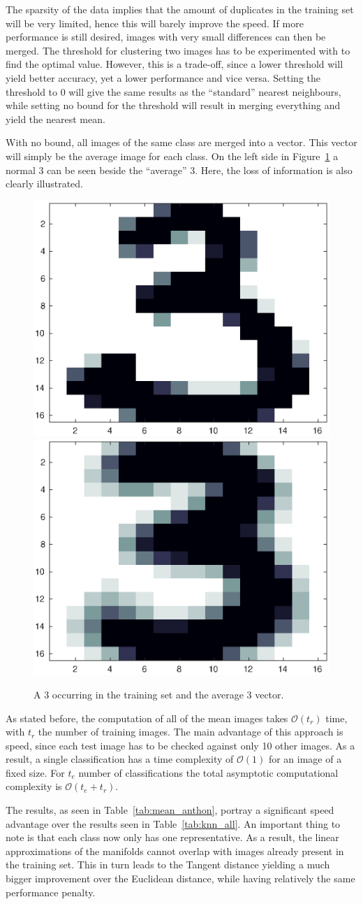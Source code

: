 The sparsity of the data implies that the amount of duplicates in the training set will be very limited, hence this will barely improve the speed.
If more performance is still desired, images with very small differences can then be merged.
The threshold for clustering two images has to be experimented with to find the optimal value.
However, this is a trade-off, since a lower threshold will yield better accuracy, yet a lower performance and vice versa.
Setting the threshold to 0 will give the same results as the ``standard'' nearest neighbours, while setting no bound for the threshold will result in merging everything and yield the nearest mean.

With no bound, all images of the same class are merged into a vector.
This vector will simply be the average image for each class.
On the left side in Figure~\ref{fig:train_3} a normal 3 can be seen beside the ``average'' 3.
Here, the loss of information is also clearly illustrated.
\begin{figure}[H]
    \centering
    \includegraphics[width = 0.3 \textwidth]{images/train_3.eps}\includegraphics[width = 0.3 \textwidth]{images/average_3.eps}
    \caption{A 3 occurring in the training set and the average 3 vector.}\label{fig:train_3}
\end{figure}
As stated before, the computation of all of the mean images takes \(\mathcal{O}(t_r)\) time, with \(t_r\) the number of training images.
The main advantage of this approach is speed, since each test image has to be checked against only 10 other images.
As a result, a single classification has a time complexity of \(\mathcal{O}(1)\) for an image of a fixed size.
For \(t_e\) number of classifications the total asymptotic computational complexity is \(\mathcal{O}(t_e + t_r)\).

The results, as seen in Table~\ref{tab:mean_anthon}, portray a significant speed advantage over the results seen in Table~\ref{tab:knn_all}.
An important thing to note is that each class now only has one representative.
As a result, the linear approximations of the manifolds cannot overlap with images already present in the training set.
This in turn leads to the Tangent distance yielding a much bigger improvement over the Euclidean distance, while having relatively the same performance penalty.

